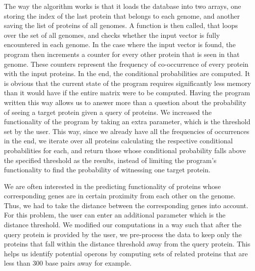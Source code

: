 \documentclass{ucetd}
\begin{document}
The way the algorithm works is that it loads the database into two arrays, one storing the index of the last protein that belongs to each genome, and another saving the list of proteins of all genomes. A function is then called, that loops over the set of all genomes, and checks whether the input vector is fully encountered in each genome. In the case where the input vector is found, the program then increments a counter for every other protein that is seen in that genome. These counters represent the frequency of co-occurrence of every protein with the input proteins. In the end, the conditional probabilities are computed. It is obvious that the current state of the program requires significantly less memory than it would have if the entire matrix were to be computed.
Having the program written this way allows us to answer more than a question about the probability of seeing a target protein given a query of proteins. We increased the functionality of the program by taking an extra parameter, which is the threshold set by the user. This way, since we already have all the frequencies of occurrences in the end, we iterate over all proteins calculating the respective conditional probabilities for each, and return those whose conditional probability falls above the specified threshold as the results, instead of limiting the program's functionality to find the probability of witnessing one target protein.

We are often interested in the predicting functionality of proteins whose corresponding genes are in certain proximity from each other on the genome. Thus, we had to take the distance between the corresponding genes into account. For this problem, the user can enter an additional parameter which is the distance threshold. We modified our computations in a way such that after the query protein is provided by the user, we pre-process the data to keep only the proteins that fall within the distance threshold away from the query protein. This helps us identify potential operons by computing sets of related proteins that are less than 300 base pairs away for example.
\end{document}

